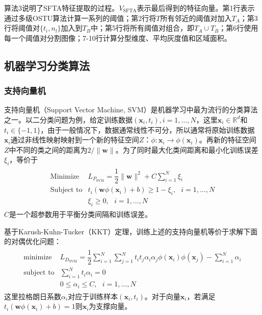 \documentclass[supercite]{HustGraduPaper}
\begin{document}
\begin{sloppypar}
  算法3说明了SFTA特征提取的过程。$V_{\text{SFTA}}$表示最后得到的特征向量。第1行表示通过多级OSTU算法计算一系列的阈值；第2行将$T$所有邻近的阈值对加入$T_A$；第3行将阈值对$\{ t_i,n_l \}$加入到$T_B$中；第5行将所有阈值对组合，即$T_A\cup T_B$；第6行使用每一个阈值对分割图像；7-10行计算分型维度、平均灰度值和区域面积。
  \subsection{机器学习分类算法}
  \subsubsection{支持向量机}
  支持向量机（Support Vector Machine, SVM）是机器学习中最为流行的分类算法之一。以二分类问题为例，给定训练数据$(\bm{x}_i,t_i),i=1,\dots,N$，这里$\bm{x}_i\in\mathbb{R}^d$和$t_i\in\{ -1,1 \}$，由于一般情况下，数据通常线性不可分，所以通常将原始训练数据$\bm{x}_i$通过非线性映射映射到一个新的特征空间$Z$：$\phi:\bm{x}_i\to\phi(\bm{x}_i)$。再新的特征空间$Z$中不同的类之间的距离为$2/\lVert \bm{w} \rVert$。为了同时最大化类间距离和最小化训练误差$\xi_i$，等价于\begin{gather}
  \begin{array}{ll}
  \text{Minimize}&L_{P_{\text{SVM}}}=\dfrac{1}{2}\lVert \bm{w} \rVert^2+C\sum\limits^N_{i=1}\xi_i\\
  \text{Subject to}&t_i(\bm{w}\phi(\bm{x}_i)+b)\geq 1-\xi_i,\text{ }i=1,\dots,N\\
                 &\xi_i\geq 0,\text{ }i=1,\dots,N
  \end{array}
  \end{gather}
  $C$是一个超参数用于平衡分类间隔和训练误差。

  基于Karush-Kuhn-Tucker（KKT）定理，训练上述的支持向量机等价于求解下面的对偶优化问题：\begin{gather}
   \begin{array}{ll}
   \text{minimize}&L_{D_{\text{SVM}}}=\dfrac{1}{2}\sum\limits^N_{i=1}\sum\limits^N_{j=1}t_it_j\alpha_i\alpha_j\phi(\bm{x}_i)\phi(\bm{x}_j)-\sum\limits^N_{i=1}\alpha_i\\
   \text{subject to}&\sum^N_{i=1}t_i\alpha_i=0\\
                    &0\leq\alpha_i\leq C,\text{ }i=1,\dots,N
   \end{array}
  \end{gather}
  这里拉格朗日系数$\alpha_i$对应于训练样本$(\bm{x}_i,t_i)$。对于向量$\bm{x}_i$，若满足$t_i(\bm{w}\phi(\bm{x}_i)+b)=1$则$\bm{x}_i$为支撑向量。


\end{sloppypar}
\end{document}
